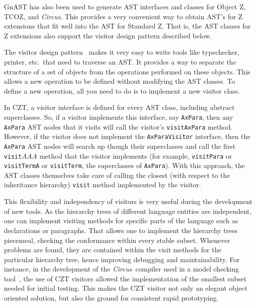 \documentclass{llncs}
\newcommand{\Circus}{{\sf\slshape Circus}}
\newcommand{\Interface}[1]{\texttt{#1}}
\newcommand{\Method}[1]{\texttt{#1}}
\begin{document}
  GnAST has also been used to generate AST interfaces and classes for
  Object Z, TCOZ, and \Circus.  This provides a very convenient way to
  obtain AST's for Z extensions that fit well into the AST for
  Standard Z.  That is, the AST classes for Z extensions also support
  the visitor design pattern described below.

  The visitor design pattern~\cite{GamEA:95,MaiCha:01} makes it very
  easy to write tools like typechecker, printer, etc.\ that need to
  traverse an AST. It provides a way to separate the structure of a
  set of objects from the operations performed on these objects.  This
  allows a new operation to be defined without modifying the AST
  classes.  To define a new operation, all you need to do is to
  implement a new visitor class.

  In CZT, a visitor interface is defined for every AST class,
  including abstract superclasses.  So, if a visitor implements this
  interface, say \Interface{AxPara}, then any \Interface{AxPara} AST
  nodes that it visits will call the visitor's \Method{visitAxPara}
  method.  However, if the visitor does not implement the
  \Interface{AxParaVisitor} interface, then the \Interface{AxPara} AST
  nodes will search up though their superclasses and call the first
  \Method{visit$AAA$} method that the visitor implements (for example,
  \Interface{visitPara} or \Interface{visitTermA} or
  \Interface{visitTerm}, the superclasses of \Interface{AxPara}).
  With this approach, the AST classes themselves take care of calling
  the closest (with respect to the inheritance hierarchy)
  \Method{visit} method implemented by the visitor.

  This flexibility and independency of visitors is very useful during
  the development of new tools.  As the hierarchy trees of different
  language entities are independent, one can implement visiting
  methods for specific parts of the language such as declarations or
  paragraphs.  That allows one to implement the hierarchy trees
  piecemeal, checking the conformance within every stable subset.
  Whenever problems are found, they are contained within the visit
  methods for the particular hierarchy tree, hence improving debugging
  and maintainability.  For instance, in the development of the
  \Circus\ compiler used in a model checking
  tool~\cite{circus.mc:leo}, the use of CZT visitors allowed the
  implementation of the smallest subset needed for initial testing.
  This makes the CZT visitor not only an elegant object oriented
  solution, but also the ground for consistent rapid prototyping.
\end{document}

